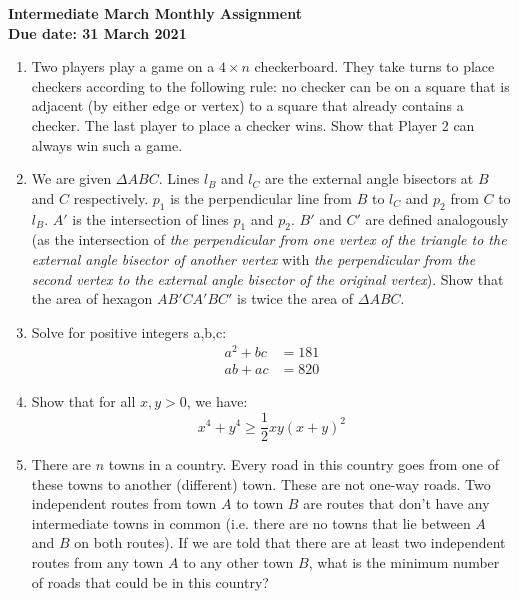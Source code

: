 \documentclass{article}
\begin{document}
\thispagestyle{empty}

\begin{center}
  \textbf{\Large Intermediate March Monthly Assignment}
  \\ \vspace{1em}
  \textbf{\large Due date: 31 March 2021}
\end{center}

\vfill
\vfill

\begin{enumerate}[1.]

\vfill
\item %
Two players play a game on a ${4\times n}$ checkerboard. They take turns to place checkers according to the following rule: no checker can be on a square that is adjacent (by either edge or vertex) to a square that already contains a checker. The last player to place a checker wins. Show that Player 2 can always win such a game.


\vfill
\item %
We are given ${\Delta ABC}$. Lines ${l_B}$ and ${l_C}$ are the external angle bisectors at ${B}$ and ${C}$ respectively. ${p_1}$ is the perpendicular line from ${B}$ to ${l_C}$ and ${p_2}$ from ${C}$ to ${l_B}$. ${A'}$ is the intersection of lines ${p_1}$ and ${p_2}$. ${B'}$ and ${C'}$ are defined analogously (as the intersection of \textit{the perpendicular from one vertex of the triangle to the external angle bisector of another vertex} with \textit{the perpendicular from the second vertex to the external angle bisector of the original vertex}). Show that the area of hexagon ${AB'CA'BC'}$ is twice the area of ${\Delta ABC}$.


\vfill
\item %
Solve for positive integers a,b,c:
\begin{align*}
a^2+bc&=181\\
ab+ac&=820
\end{align*}

\vfill
\item %
Show that for all ${x,y>0}$, we have:
$${x^4 + y^4 \geq \frac{1}{2} xy (x+y)^2}$$


\vfill
\item %
There are $n$ towns in a country.
Every road in this country goes from one of these towns to another (different) town. These are not one-way roads.
Two independent routes from town $A$ to town $B$ are routes that don't have any intermediate towns in common (i.e. there are no towns that lie between $A$ and $B$ on both routes).
If we are told that there are at least two independent routes from any town $A$ to any other town $B$, what is the minimum number of roads that could be in this country?



\end{enumerate}
\end{document}
